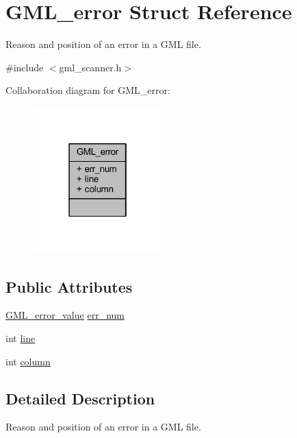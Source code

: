 \hypertarget{struct_g_m_l__error}{}\section{G\+M\+L\+\_\+error Struct Reference}
\label{struct_g_m_l__error}


Reason and position of an error in a G\+ML file.  




{\ttfamily \#include $<$gml\+\_\+scanner.\+h$>$}



Collaboration diagram for G\+M\+L\+\_\+error\+:\nopagebreak
\begin{figure}[H]
\begin{center}
\leavevmode
\includegraphics[width=142pt]{struct_g_m_l__error__coll__graph}
\end{center}
\end{figure}
\subsection*{Public Attributes}
\begin{DoxyCompactItemize}
\item 
\mbox{\hyperlink{gml__scanner_8h_aabc90afcb30e75bca3bd9969ce74790c}{G\+M\+L\+\_\+error\+\_\+value}} \mbox{\hyperlink{struct_g_m_l__error_a66fe2c5a3d2d40e77ff486007dfe7f76}{err\+\_\+num}}
\item 
int \mbox{\hyperlink{struct_g_m_l__error_a4e9d11b6501f91a982af87f45962b7b3}{line}}
\item 
int \mbox{\hyperlink{struct_g_m_l__error_a0708757bcd78a82077a0577982f2c433}{column}}
\end{DoxyCompactItemize}


\subsection{Detailed Description}
Reason and position of an error in a G\+ML file. 

